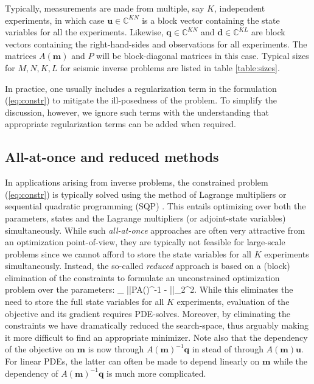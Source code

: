 \documentclass{iopart}
\begin{document}
{Typically, measurements are made from multiple, say $K$, independent experiments,
in which case $\mathbf{u} \in \mathbb{C}^{KN}$ is a block vector containing the state variables for all the experiments. Likewise, $\mathbf{q}\in \mathbb{C}^{KN}$ and $\mathbf{d}\in \mathbb{C}^{KL}$ are block vectors containing the right-hand-sides and observations for all experiments. The matrices $A(\mathbf{m})$ and $P$ will be block-diagonal matrices in this case. Typical sizes for $M,N,K,L$ for seismic inverse problems are listed in table \ref{table:sizes}.

In practice, one usually includes a regularization term in the formulation (\ref{eq:constr}) to mitigate the ill-posedness of the problem. To simplify the discussion, however, we ignore such terms with the understanding that appropriate regularization terms can be added when required.

\subsection{All-at-once and reduced methods}
In applications arising from inverse problems, the constrained problem (\ref{eq:constr}) is typically solved using the method of Lagrange multipliers \cite{Haber2000,Grote2014} or sequential quadratic programming (SQP) \cite{Dennis1998,Heinkenschloss2008}. This entails optimizing over both the parameters, states and the Lagrange multipliers (or adjoint-state variables) simultaneously. While such \emph{all-at-once} approaches are often very attractive from an optimization point-of-view, they are typically not feasible for large-scale problems since we cannot afford to store the state variables for all $K$ experiments simultaneously. Instead, the so-called \emph{reduced} approach is based on a (block) elimination of the constraints to formulate an unconstrained optimization problem over the parameters:
\bq
\label{eq:red}
\min_{} ||PA()^{-1} - ||_2^2.
\eq
While this eliminates the need to store the full state variables for all $K$ experiments, evaluation of the objective and its gradient requires PDE-solves. Moreover, by eliminating the constraints we have dramatically reduced the search-space, thus arguably making it more difficult to find an appropriate minimizer. Note also that the dependency of the objective on $\mathbf{m}$ is now through $A(\mathbf{m})^{-1}\mathbf{q}$ in stead of through $A(\mathbf{m})\mathbf{u}$. For linear PDEs, the latter can often be made to depend linearly on $\mathbf{m}$ while the dependency of $A(\mathbf{m})^{-1}\mathbf{q}$ is much more complicated.

}
\end{document}
